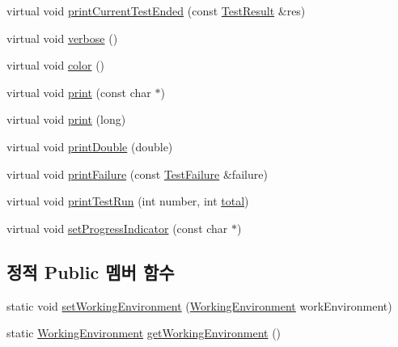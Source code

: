 \begin{DoxyCompactItemize}
\item 
virtual void \hyperlink{class_test_output_a67acd3c53695126b4728c7da0d2b0b51}{print\+Current\+Test\+Ended} (const \hyperlink{class_test_result}{Test\+Result} \&res)
\item 
virtual void \hyperlink{class_test_output_a2ae0a8d48809abb33b5ba47c56fdc3ad}{verbose} ()
\item 
virtual void \hyperlink{class_test_output_ae8d23f2d3de1d9d47d8139d54fb89640}{color} ()
\item 
virtual void \hyperlink{class_test_output_a321b5c489a90374cb61c34fe5d2253ef}{print} (const char $\ast$)
\item 
virtual void \hyperlink{class_test_output_afdf7e5004a8aead20ea3b1ddec76fa73}{print} (long)
\item 
virtual void \hyperlink{class_test_output_a0ed13c187762336a2bf0fd89687b014a}{print\+Double} (double)
\item 
virtual void \hyperlink{class_test_output_abda4b89457f485fa538443ee10aecfe8}{print\+Failure} (const \hyperlink{class_test_failure}{Test\+Failure} \&failure)
\item 
virtual void \hyperlink{class_test_output_a0cffc4628d21b0cd25649f9084927ca9}{print\+Test\+Run} (int number, int \hyperlink{test__intervals_8c_ac7af894858cf396a219d632f40afdc8d}{total})
\item 
virtual void \hyperlink{class_test_output_a97c09fc275d40b7ec559aaa91843cdcd}{set\+Progress\+Indicator} (const char $\ast$)
\end{DoxyCompactItemize}
\subsection*{정적 Public 멤버 함수}
\begin{DoxyCompactItemize}
\item 
static void \hyperlink{class_test_output_a25907ddd60d8454ca78f81edef6c77c3}{set\+Working\+Environment} (\hyperlink{class_test_output_a0541851f863713454486a9fb3080f766}{Working\+Environment} work\+Environment)
\item 
static \hyperlink{class_test_output_a0541851f863713454486a9fb3080f766}{Working\+Environment} \hyperlink{class_test_output_a90d5028d0f7f6f41ca2dced042a8709d}{get\+Working\+Environment} ()
\end{DoxyCompactItemize}

